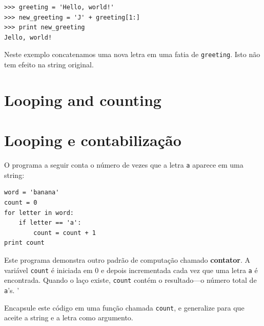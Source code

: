 {\beforeverb
\begin{verbatim}
>>> greeting = 'Hello, world!'
>>> new_greeting = 'J' + greeting[1:]
>>> print new_greeting
Jello, world!
\end{verbatim}
\afterverb
%
%
Neste exemplo concatenamos uma nova letra em uma fatia de {\tt greeting}.
Isto não tem efeito na string original.


\section{Looping and counting}
\section{Looping e contabilização}
\label{counter}
\label{contador}



O programa a seguir conta o número de vezes que a letra {\tt a} aparece em
uma string:

\beforeverb
\begin{verbatim}
word = 'banana'
count = 0
for letter in word:
    if letter == 'a':
        count = count + 1
print count
\end{verbatim}
\afterverb
%
%
Este programa demonstra outro padrão de computação chamado {\bf contator}. A
variável {\tt count} é iniciada em 0 e depois incrementada cada vez que uma
letra {\tt a} é encontrada. Quando o laço existe, {\tt count} contém o
resultado---o número total de {\tt a}'s.
'
\begin{ex}

Encapsule este código em uma função chamada {\tt count}, e generalize para
que aceite a string e a letra como argumento.
\end{ex}

}

